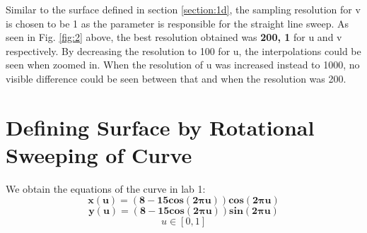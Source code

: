 \documentclass[acmlarge,nonacm=true]{acmart}
\begin{document}
Similar to the surface defined in section \ref{section:1d}, the sampling resolution for v is chosen to be 1 as the parameter is responsible for the straight line sweep.
 As seen in Fig. \ref{fig:2} above, the best resolution obtained was \textbf{200, 1} for u and v respectively.
By decreasing the resolution to 100 for u, the interpolations could be seen when zoomed in. When the resolution of u was 
increased instead to 1000, no visible difference could be seen between that and when the resolution was 200.

\section{Defining Surface by Rotational Sweeping of Curve}
We obtain the equations of the curve in lab 1:
\begin{displaymath}
	\mathbf{x(u) =  (8 - 15cos(2\pi u))cos(2\pi u)}
\end{displaymath}
\begin{displaymath}
	\mathbf{y(u) =  (8 - 15cos(2\pi u))sin(2\pi u)}
\end{displaymath}
\begin{displaymath}
	u \in [0, 1]
\end{displaymath}


\newpage
\end{document}
